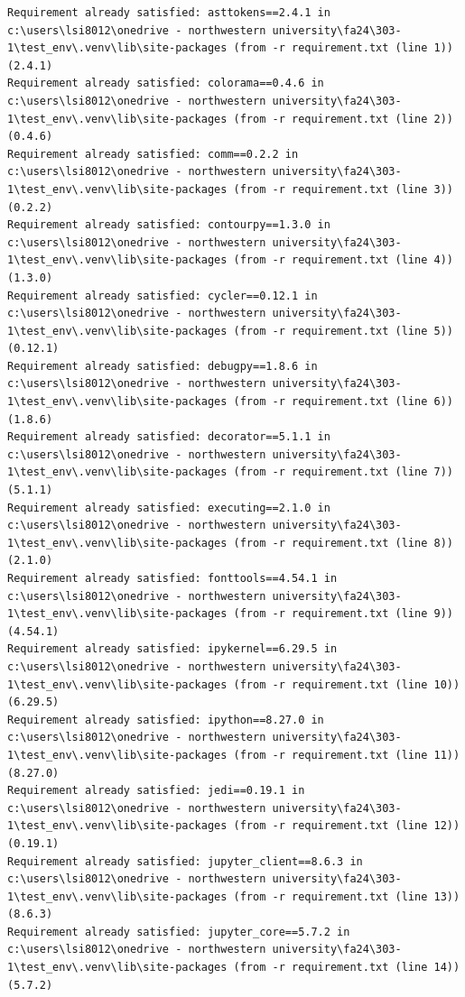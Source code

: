 \documentclass[
  letterpaper,
  DIV=11,
  numbers=noendperiod]{scrreprt}
\begin{document}
\begin{verbatim}
Requirement already satisfied: asttokens==2.4.1 in c:\users\lsi8012\onedrive - northwestern university\fa24\303-1\test_env\.venv\lib\site-packages (from -r requirement.txt (line 1)) (2.4.1)
Requirement already satisfied: colorama==0.4.6 in c:\users\lsi8012\onedrive - northwestern university\fa24\303-1\test_env\.venv\lib\site-packages (from -r requirement.txt (line 2)) (0.4.6)
Requirement already satisfied: comm==0.2.2 in c:\users\lsi8012\onedrive - northwestern university\fa24\303-1\test_env\.venv\lib\site-packages (from -r requirement.txt (line 3)) (0.2.2)
Requirement already satisfied: contourpy==1.3.0 in c:\users\lsi8012\onedrive - northwestern university\fa24\303-1\test_env\.venv\lib\site-packages (from -r requirement.txt (line 4)) (1.3.0)
Requirement already satisfied: cycler==0.12.1 in c:\users\lsi8012\onedrive - northwestern university\fa24\303-1\test_env\.venv\lib\site-packages (from -r requirement.txt (line 5)) (0.12.1)
Requirement already satisfied: debugpy==1.8.6 in c:\users\lsi8012\onedrive - northwestern university\fa24\303-1\test_env\.venv\lib\site-packages (from -r requirement.txt (line 6)) (1.8.6)
Requirement already satisfied: decorator==5.1.1 in c:\users\lsi8012\onedrive - northwestern university\fa24\303-1\test_env\.venv\lib\site-packages (from -r requirement.txt (line 7)) (5.1.1)
Requirement already satisfied: executing==2.1.0 in c:\users\lsi8012\onedrive - northwestern university\fa24\303-1\test_env\.venv\lib\site-packages (from -r requirement.txt (line 8)) (2.1.0)
Requirement already satisfied: fonttools==4.54.1 in c:\users\lsi8012\onedrive - northwestern university\fa24\303-1\test_env\.venv\lib\site-packages (from -r requirement.txt (line 9)) (4.54.1)
Requirement already satisfied: ipykernel==6.29.5 in c:\users\lsi8012\onedrive - northwestern university\fa24\303-1\test_env\.venv\lib\site-packages (from -r requirement.txt (line 10)) (6.29.5)
Requirement already satisfied: ipython==8.27.0 in c:\users\lsi8012\onedrive - northwestern university\fa24\303-1\test_env\.venv\lib\site-packages (from -r requirement.txt (line 11)) (8.27.0)
Requirement already satisfied: jedi==0.19.1 in c:\users\lsi8012\onedrive - northwestern university\fa24\303-1\test_env\.venv\lib\site-packages (from -r requirement.txt (line 12)) (0.19.1)
Requirement already satisfied: jupyter_client==8.6.3 in c:\users\lsi8012\onedrive - northwestern university\fa24\303-1\test_env\.venv\lib\site-packages (from -r requirement.txt (line 13)) (8.6.3)
Requirement already satisfied: jupyter_core==5.7.2 in c:\users\lsi8012\onedrive - northwestern university\fa24\303-1\test_env\.venv\lib\site-packages (from -r requirement.txt (line 14)) (5.7.2)

\end{verbatim}
\end{document}
